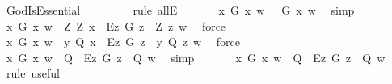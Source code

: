 \begin{isabellebody}
\ GodIsEssential\ \isanewline
\ \ \ \ \ \ \isamarkupfalse%
\ {\isacharparenleft}rule\ allE{\isacharparenright}\ %
\isanewline
\ \ \ \ \isamarkupfalse%
\ {\isachardoublequoteopen}{\isasymforall}x{\isachardot}\ G\ x\ w\ {\isasymlongrightarrow}\ {\isasymE}\ G\ x\ w{\isachardoublequoteclose}\ \isamarkupfalse%
\ simp\isanewline
\ \ \ \ \isamarkupfalse%
\ {\isachardoublequoteopen}{\isasymforall}x{\isachardot}\ G\ x\ w\ {\isasymlongrightarrow}\ {\isacharparenleft}\isactrlbold {\isasymforall}Z{\isachardot}\ Z\ x\ \isactrlbold {\isasymrightarrow}\ \isactrlbold {\isasymbox}{\isacharparenleft}\isactrlbold {\isasymforall}\isactrlsup Ez{\isachardot}\ G\ z\ \isactrlbold {\isasymrightarrow}\ Z\ z{\isacharparenright}{\isacharparenright}\ w{\isachardoublequoteclose}\ \isamarkupfalse%
\ force\isanewline
\ \ \ \ \isamarkupfalse%
\ {\isachardoublequoteopen}{\isasymforall}x{\isachardot}\ G\ x\ w\ {\isasymlongrightarrow}\ {\isacharparenleft}{\isacharparenleft}{\isasymlambda}y{\isachardot}\ Q{\isacharparenright}\ x\ \isactrlbold {\isasymrightarrow}\ \isactrlbold {\isasymbox}{\isacharparenleft}\isactrlbold {\isasymforall}\isactrlsup Ez{\isachardot}\ G\ z\ \isactrlbold {\isasymrightarrow}\ {\isacharparenleft}{\isasymlambda}y{\isachardot}\ Q{\isacharparenright}\ z{\isacharparenright}{\isacharparenright}\ w{\isachardoublequoteclose}\ \isamarkupfalse%
\ force\isanewline
\ \ \ \ \isamarkupfalse%
\ {\isachardoublequoteopen}{\isasymforall}x{\isachardot}\ G\ x\ w\ {\isasymlongrightarrow}\ {\isacharparenleft}Q\ \isactrlbold {\isasymrightarrow}\ \isactrlbold {\isasymbox}{\isacharparenleft}\isactrlbold {\isasymforall}\isactrlsup Ez{\isachardot}\ G\ z\ \isactrlbold {\isasymrightarrow}\ Q{\isacharparenright}{\isacharparenright}\ w{\isachardoublequoteclose}\ \isamarkupfalse%
\ simp\isanewline
\ \ \ \ \isamarkupfalse%
\ {}{\isacharcolon}\ {\isachardoublequoteopen}{\isacharparenleft}{\isasymexists}x{\isachardot}\ G\ x\ w{\isacharparenright}\ {\isasymlongrightarrow}\ {\isacharparenleft}{\isacharparenleft}Q\ \isactrlbold {\isasymrightarrow}\ \isactrlbold {\isasymbox}{\isacharparenleft}\isactrlbold {\isasymforall}\isactrlsup Ez{\isachardot}\ G\ z\ \isactrlbold {\isasymrightarrow}\ Q{\isacharparenright}{\isacharparenright}\ w{\isacharparenright}{\isachardoublequoteclose}\ \isamarkupfalse%
\ {\isacharparenleft}rule\ useful{\isacharparenright}\isanewline
\ \ \ \ \isamarkupfalse%

\end{isabellebody}
